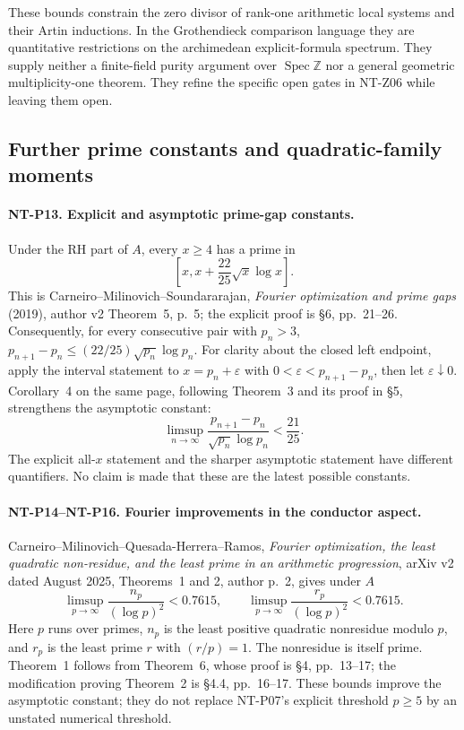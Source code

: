 \documentclass[11pt,a4paper]{article}
\begin{document}
These bounds constrain the zero divisor of rank-one arithmetic
local systems and their Artin inductions.  In the Grothendieck
comparison language they are quantitative restrictions on the
archimedean explicit-formula spectrum.  They supply neither a
finite-field purity argument over $\operatorname{Spec}\mathbb Z$
nor a general geometric multiplicity-one theorem.  They refine the
specific open gates in NT-Z06 while leaving them open.

\subsection{Further prime constants and quadratic-family moments}

\paragraph{NT-P13. Explicit and asymptotic prime-gap constants.}
Under the RH part of $A$, every $x\ge4$ has a prime in
\[
 \left[x,x+\frac{22}{25}\sqrt x\log x\right].
\]
This is Carneiro--Milinovich--Soundararajan,
\emph{Fourier optimization and prime gaps} (2019), author v2
Theorem~5, p.~5; the explicit proof is \S6, pp.~21--26.
Consequently, for every consecutive pair with $p_n>3$,
$p_{n+1}-p_n\le(22/25)\sqrt{p_n}\log p_n$.
For clarity about the closed left endpoint, apply the interval
statement to $x=p_n+\varepsilon$ with
$0<\varepsilon<p_{n+1}-p_n$, then let $\varepsilon\downarrow0$.
Corollary~4 on the same page, following Theorem~3 and its proof in
\S5, strengthens the asymptotic constant:
\[
 \limsup_{n\to\infty}
       \frac{p_{n+1}-p_n}{\sqrt{p_n}\log p_n}<\frac{21}{25}.
\]
The explicit all-$x$ statement and the sharper asymptotic statement
have different quantifiers.  No claim is made that these are the
latest possible constants.

\paragraph{NT-P14--NT-P16. Fourier improvements in the conductor aspect.}
Carneiro--Milinovich--Quesada-Herrera--Ramos,
\emph{Fourier optimization, the least quadratic non-residue, and
the least prime in an arithmetic progression}, arXiv v2 dated
August 2025, Theorems~1 and 2, author p.~2, gives under $A$
\[
 \limsup_{p\to\infty}\frac{n_p}{(\log p)^2}<0.7615,
 \qquad
 \limsup_{p\to\infty}\frac{r_p}{(\log p)^2}<0.7615.
\tag{NT-P14}
\]
Here $p$ runs over primes, $n_p$ is the least positive quadratic
nonresidue modulo $p$, and $r_p$ is the least prime $r$ with
$(r/p)=1$.  The nonresidue is itself prime.  Theorem~1 follows from
Theorem~6, whose proof is \S4, pp.~13--17; the modification proving
Theorem~2 is \S4.4, pp.~16--17.  These bounds improve the
asymptotic constant; they do not replace NT-P07's explicit threshold
$p\ge5$ by an unstated numerical threshold.
\end{document}
